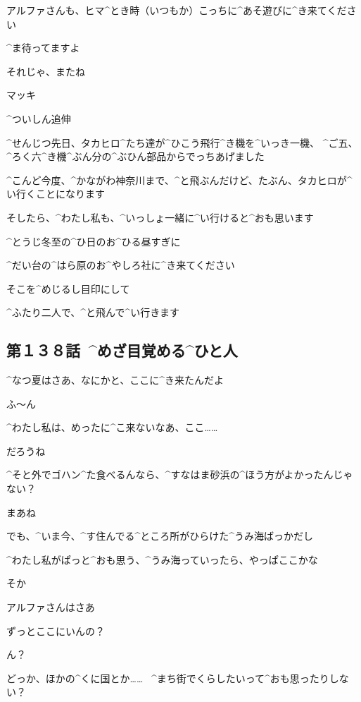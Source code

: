 \Makki アルファさんも、ヒマ^{とき}{時}（いつもか）こっちに^{あそ}{遊}びに^{き}{来}てください

\Makki ^{ま}{待}ってますよ

\page
\Makki それじゃ、またね

\Makki マッキ

\page
\Makki ^{ついしん}{追伸}

\Makki ^{せんじつ}{先日}、タカヒロ^{たち}{達}が^{ひこう}{飛行}^{き}{機}を^{いっき}{一機}、
^{ご}{五}、^{ろく}{六}^{き}{機}^{ぶん}{分}の^{ぶひん}{部品}からでっちあげました

\Makki ^{こんど}{今度}、^{かながわ}{神奈川}まで、^{と}{飛}ぶんだけど、たぶん、タカヒロが^{い}{行}くことになります

\page
\Makki そしたら、^{わたし}{私}も、^{いっしょ}{一緒}に^{い}{行}けると^{おも}{思}います

\Makki ^{とうじ}{冬至}の^{ひ}{日}のお^{ひる}{昼}すぎに

\Makki ^{だい}{台}の^{はら}{原}のお^{やしろ}{社}に^{き}{来}てください

\Makki そこを^{めじるし}{目印}にして

\page
\Makki ^{ふたり}{二人}で、^{と}{飛}んで^{い}{行}きます


\subsection{第１３８話\ ^{めざ}{目覚}める^{ひと}{人}}

\page[108]
\Makki ^{なつ}{夏}はさあ、なにかと、ここに^{き}{来}たんだよ

\Alpha ふ〜ん

\page
\Alpha ^{わたし}{私}は、めったに^{こ}{来}ないなあ、ここ……

\Makki だろうね

\Alpha ^{そと}{外}でゴハン^{た}{食}べるんなら、^{すなはま}{砂浜}の^{ほう}{方}がよかったんじゃない？

\Makki まあね

\Makki でも、^{いま}{今}、^{す}{住}んでる^{ところ}{所}がひらけた^{うみ}{海}ばっかだし

\Makki ^{わたし}{私}がぱっと^{おも}{思}う、^{うみ}{海}っていったら、やっぱここかな

\Alpha そか

\page
\Makki アルファさんはさあ

\Makki ずっとここにいんの？

\Alpha ん？

\Makki どっか、ほかの^{くに}{国}とか……
\ ^{まち}{街}でくらしたいって^{おも}{思}ったりしない？

